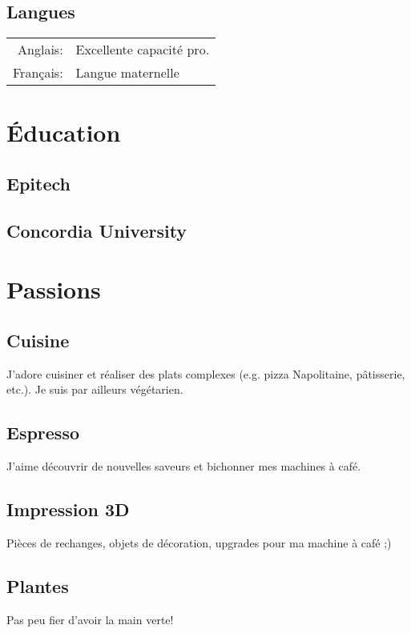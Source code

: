 \documentclass[
  french,
  a4paper
]{resume-openfont}
\begin{document}
\begin{minipage}[t]{0.31\textwidth}
\subsection{Langues}
\vspace{2pt}
\begin{tabular}{@{}r@{\hskip 0.5em}l}
Anglais: &Excellente capacité pro.\\
Français: &Langue maternelle
\end{tabular}
\sectionsep

\section{Éducation}

\subsection{Epitech}
\subtitle{Master en Informatique\\Major de promotion}
\sectionsep

\subsection{Concordia University}
\subtitle{Étudiant international en informatique, niveau master}


\section{Passions}

\subsection{Cuisine}
J'adore cuisiner et réaliser des plats complexes (e.g. pizza Napolitaine, pâtisserie, etc.). Je suis par ailleurs végétarien.

\sectionsep

\subsection{Espresso}
J'aime découvrir de nouvelles saveurs et bichonner mes machines à café.
\sectionsep

\subsection{Impression 3D}
Pièces de rechanges, objets de décoration, upgrades pour ma machine à café ;)

\sectionsep
\subsection{Plantes}
Pas peu fier d'avoir la main verte!

%
%
\end{minipage}%
\end{document}
